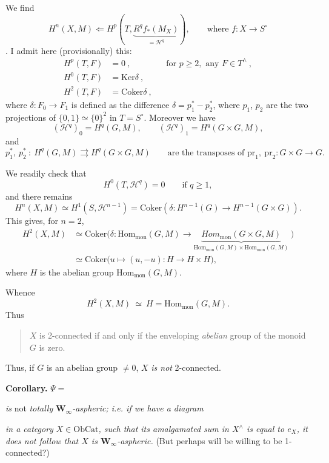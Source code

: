 \documentclass[11pt]{article}
\newcommand{\printedpage}[1]{\marginpar{\footnotesize p.~#1}}
\newcommand{\msp}[1]{\marginpar{\footnotesize [#1]}}
\newcommand{\Hom}{\mathrm{Hom}}
\newcommand{\Ob}{\mathrm{Ob}}
\newcommand{\Cat}{\mathrm{Cat}}
\newcommand{\pr}{\mathrm{pr}}
\newcommand{\Ker}{\mathrm{Ker}}
\newcommand{\Coker}{\mathrm{Coker}}
\newcommand{\mon}{\mathrm{mon}}
\begin{document}
We find
\[
H^n(X,M) \Longleftarrow H^p(T, \underbrace{R^q f_*(M_X)}_{= \mathcal{H}^q}), \qquad \text{where } f : X \longrightarrow S^\circ
\]
. I admit here (provisionally) this: %
\[
\begin{aligned}
H^p(T,F) &= 0 \ , &&\text{for } p\geq 2, \text{ any } F\in T^\wedge \ ,\\
H^0(T,F) &= \Ker\delta \ , &&\\
H^2(T,F) &= \Coker\delta \ , && %
\end{aligned}
\]
\printedpage{3}
where $\delta : F_0 \longrightarrow F_1$ is defined as the difference $\delta = p_1^* - p_2^*$, where $p_1$, $p_2$ are the two projections of $\{0,1\}\simeq\{0\}^2$ in $T = S^\circ$. Moreover we have
\[
(\mathcal{H}^q)_0 = H^q(G,M), \qquad (\mathcal{H}^q)_1 = H^q(G\times G, M),
\]
and
\[
p_1^*,\ p_2^*\ :\ H^q(G,M) \rightrightarrows H^q(G{\times}G, M) \qquad \text{are the transposes of } \pr_1,\ \pr_2 : G\times G\longrightarrow G.
\]

\msp{page 4}
We readily check that
\[
H^0(T,\mathcal{H}^q) = 0 \qquad \text{if } q\geq 1,
\]
and there remains
\[
H^n(X,M) \simeq H^1(S,\mathcal{H}^{n-1}) = \Coker(\delta : H^{n-1}(G) \longrightarrow H^{n-1}(G\times G)). %
\]
This gives, for $n = 2$,
\[
\begin{aligned}
H^2(X,M) &\simeq \Coker\Big(\delta : \Hom_\mon(G,M) \longrightarrow \underbrace{\mathit{Hom}_\mon(G\times G, M)}_{\Hom_\mon(G,M)\times\Hom_\mon(G,M)} \ \Big)\\
&\simeq \Coker\Big(u\longmapsto (u,-u) : H \longrightarrow H\times H\Big),
\end{aligned}
\]
where $H$ is the abelian group $\Hom_\mon(G,M)$.

Whence
\[
H^2(X,M) \ \simeq\ H = \Hom_\mon(G,M).
\]
Thus
\begin{quote}
$X$ is 2-connected if and only if the enveloping \textit{abelian} group of the monoid $G$ is zero.
\end{quote}

Thus, if $G$ is an abelian group $\neq 0$, $X$ \textit{is not} 2-connected.

\textbf{Corollary.} $\Psi = {}$
\textit{is} not \textit{totally} $\mathbf{W}_\infty$\textit{-aspheric; i.e. if we have a diagram} 
\textit{in a category} $X\in\Ob\Cat$\textit{, such that its amalgamated sum in $X^\wedge$ is equal to $e_X$, it does not follow that $X$ is $\mathbf{W}_\infty$-aspheric.} (But perhaps will be willing to be 1-connected?)
\end{document}
